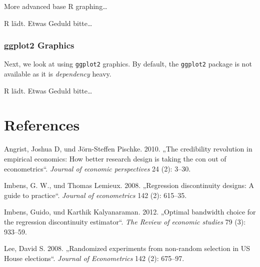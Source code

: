 \documentclass[
  letterpaper,
  DIV=11,
  oneside]{scrreprt}
\newlength{\cslhangindent}
\newlength{\cslentryspacingunit} %
\newenvironment{CSLReferences}[2] %
 {%
  \setlength{\parindent}{0pt}
  \ifodd #1
  \let\oldpar\par
  \def\par{\hangindent=\cslhangindent\oldpar}
  \fi
  \setlength{\parskip}{#2\cslentryspacingunit}
 }%
 {}
\begin{document}
\hypertarget{webr-code-output-8}{}

More advanced base R graphing\ldots{}

R lädt. Etwas Geduld bitte\ldots{}

\hypertarget{webr-editor-9}{}

\hypertarget{webr-code-output-9}{}

\hypertarget{ggplot2-graphics}{%
\subsection{ggplot2 Graphics}\label{ggplot2-graphics}}

Next, we look at using \texttt{ggplot2} graphics. By default, the
\texttt{ggplot2} package is not available as it is \emph{dependency}
heavy.

R lädt. Etwas Geduld bitte\ldots{}

\hypertarget{webr-editor-10}{}

\hypertarget{webr-code-output-10}{}


\hypertarget{references}{%
\chapter*{References}\label{references}}


\hypertarget{refs}{}
\begin{CSLReferences}{1}{0}
\leavevmode{}%
Angrist, Joshua D, und Jörn-Steffen Pischke. 2010. {„The credibility
revolution in empirical economics: How better research design is taking
the con out of econometrics``}. \emph{Journal of economic perspectives}
24 (2): 3--30.

\leavevmode{}%
Imbens, G. W., und Thomas Lemieux. 2008. {„Regression discontinuity
designs: A guide to practice``}. \emph{Journal of econometrics} 142 (2):
615--35.

\leavevmode{}%
Imbens, Guido, und Karthik Kalyanaraman. 2012. {„Optimal bandwidth
choice for the regression discontinuity estimator``}. \emph{The Review
of economic studies} 79 (3): 933--59.

\leavevmode{}%
Lee, David S. 2008. {„Randomized experiments from non-random selection
in US House elections``}. \emph{Journal of Econometrics} 142 (2):
675--97.

\end{CSLReferences}
\end{document}
